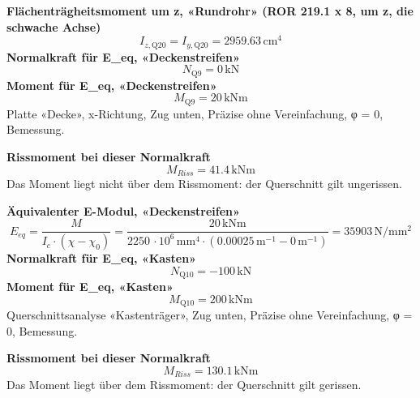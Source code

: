 \documentclass[11pt,a4paper]{article}
\begin{document}
\noindent\textbf{Flächenträgheitsmoment um z, «Rundrohr» (ROR 219.1 x 8, um z, die schwache Achse)}
\begin{equation*}
I_{z,\text{Q20}} = I_{y,\text{Q20}} = 2959.63\,\mathrm{cm}^{4}
\end{equation*}
\noindent\textbf{Normalkraft für E\_eq, «Deckenstreifen»}
\begin{equation*}
N_{\text{Q9}} = 0\,\mathrm{kN}
\end{equation*}
\noindent\textbf{Moment für E\_eq, «Deckenstreifen»}
\begin{equation*}
M_{\text{Q9}} = 20\,\mathrm{kNm}
\end{equation*}
Platte «Decke», x-Richtung, Zug unten, Präzise ohne Vereinfachung, φ = 0, Bemessung.

\noindent\textbf{Rissmoment bei dieser Normalkraft}
\begin{equation*}
M_{Riss} = 41.4\,\mathrm{kNm}
\end{equation*}
Das Moment liegt nicht über dem Rissmoment: der Querschnitt gilt ungerissen.

\noindent\textbf{Äquivalenter E-Modul, «Deckenstreifen»}
\begin{equation*}
E_{eq} = \frac{M}{I_c \cdot \left(\chi - \chi_0\right)} = \frac{20\,\mathrm{kNm}}{2250\,\cdot 10^{6}\,\mathrm{mm}^{4} \cdot \left(0.00025\,\mathrm{m}^{-1} - 0\,\mathrm{m}^{-1}\right)} = 35903\,\mathrm{N}/\mathrm{mm}^{2}
\end{equation*}
\noindent\textbf{Normalkraft für E\_eq, «Kasten»}
\begin{equation*}
N_{\text{Q10}} = -100\,\mathrm{kN}
\end{equation*}
\noindent\textbf{Moment für E\_eq, «Kasten»}
\begin{equation*}
M_{\text{Q10}} = 200\,\mathrm{kNm}
\end{equation*}
Querschnittsanalyse «Kastenträger», Zug unten, Präzise ohne Vereinfachung, φ = 0, Bemessung.

\noindent\textbf{Rissmoment bei dieser Normalkraft}
\begin{equation*}
M_{Riss} = 130.1\,\mathrm{kNm}
\end{equation*}
Das Moment liegt über dem Rissmoment: der Querschnitt gilt gerissen.
\end{document}
